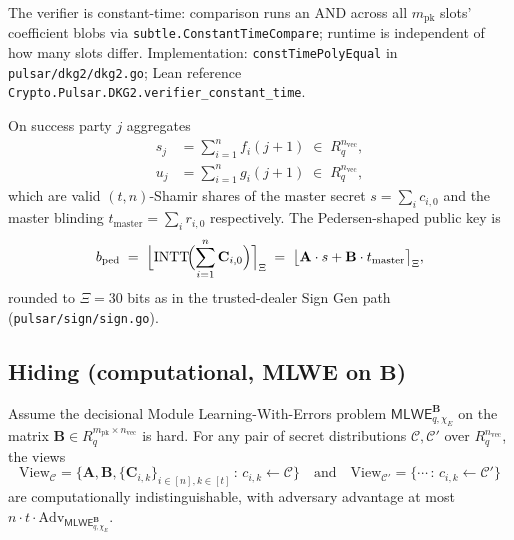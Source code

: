 The verifier is constant-time: comparison runs an AND across all
$m_{\textrm{pk}}$ slots' coefficient blobs via
\texttt{subtle.ConstantTimeCompare}; runtime is independent of how many
slots differ. Implementation: \texttt{constTimePolyEqual} in
\texttt{pulsar/dkg2/dkg2.go}; Lean reference
\texttt{Crypto.Pulsar.DKG2.verifier\_constant\_time}.

On success party $j$ aggregates
\begin{align}
s_j  &= \sum_{i=1}^{n} f_i(j+1) \;\in\; R_q^{n_{\textrm{vec}}}, \\
u_j  &= \sum_{i=1}^{n} g_i(j+1) \;\in\; R_q^{n_{\textrm{vec}}},
\end{align}
which are valid $(t,n)$-Shamir shares of the master secret
$s = \sum_i c_{i,0}$ and the master blinding
$t_{\mathrm{master}} = \sum_i r_{i,0}$ respectively. The
Pedersen-shaped public key is
\begin{equation}
\label{eq:b-ped}
b_{\mathrm{ped}}
\;=\; \Bigl\lfloor \mathrm{INTT}\!\Bigl(\sum_{i=1}^{n}\mathbf{C}_{i,0}\Bigr) \Bigr\rceil_\Xi
\;=\; \bigl\lfloor \mathbf{A}\cdot s + \mathbf{B}\cdot t_{\mathrm{master}} \bigr\rceil_\Xi,
\end{equation}
rounded to $\Xi=30$ bits as in the trusted-dealer Sign Gen path
(\texttt{pulsar/sign/sign.go}).

\subsection{Hiding (computational, MLWE on $\mathbf{B}$)}
\label{ssec:pedersen-hiding}

\begin{theorem}[Hiding]
\label{thm:pedersen-hiding}
Assume the decisional Module Learning-With-Errors problem
$\mathsf{MLWE}_{q,\chi_E}^{\mathbf{B}}$ on the matrix
$\mathbf{B}\in R_q^{m_{\textrm{pk}}\times n_{\textrm{vec}}}$ is hard.
For any pair of secret distributions $\mathcal{C},\mathcal{C}'$ over
$R_q^{n_{\textrm{vec}}}$, the views
\[
\mathrm{View}_\mathcal{C}
= \bigl\{\mathbf{A},\mathbf{B},\{\mathbf{C}_{i,k}\}_{i\in[n], k\in[t]}
  \,:\,c_{i,k}\leftarrow\mathcal{C}\bigr\}
\quad\text{and}\quad
\mathrm{View}_{\mathcal{C}'} = \bigl\{\cdots\,:\,c_{i,k}\leftarrow\mathcal{C}'\bigr\}
\]
are computationally indistinguishable, with adversary advantage at
most $n\cdot t\cdot \mathrm{Adv}_{\mathsf{MLWE}_{q,\chi_E}^\mathbf{B}}$.
\end{theorem}

